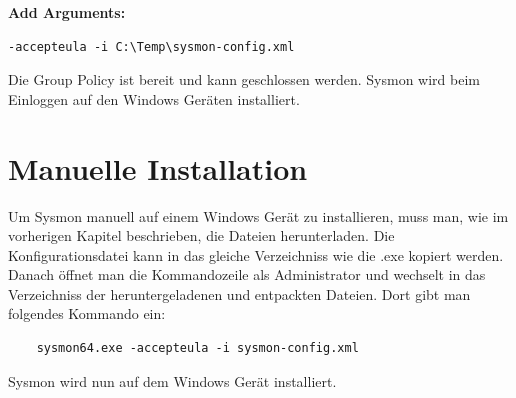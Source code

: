 \textbf{Add Arguments:}
\begin{lstlisting}
-accepteula -i C:\Temp\sysmon-config.xml
\end{lstlisting}

Die Group Policy ist bereit und kann geschlossen werden.
Sysmon wird beim Einloggen auf den Windows Geräten installiert.

\section{Manuelle Installation}
Um Sysmon manuell auf einem Windows Gerät zu installieren, muss man, wie im vorherigen Kapitel beschrieben, die Dateien herunterladen.
Die Konfigurationsdatei kann in das gleiche Verzeichniss wie die .exe kopiert werden.
Danach öffnet man die Kommandozeile als Administrator und wechselt in das Verzeichniss der heruntergeladenen und entpackten Dateien.
Dort gibt man folgendes Kommando ein:
\begin{lstlisting}
    sysmon64.exe -accepteula -i sysmon-config.xml
\end{lstlisting}

Sysmon wird nun auf dem Windows Gerät installiert.